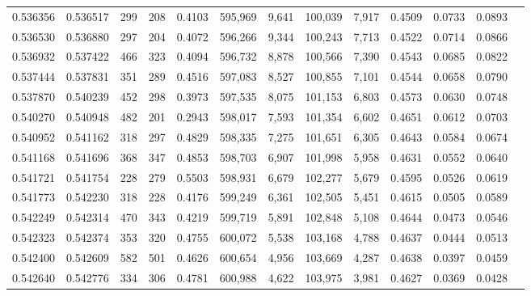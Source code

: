 \begin{tabular}{rrrrrrrrrrrrr}
0.536356 & 0.536517 &   299 &   208 &                                     0.4103 & 595,969 &   9,641 & 100,039 &   7,917 & 0.4509 & 0.0733 & 0.0893 \\
0.536530 & 0.536880 &   297 &   204 &                                     0.4072 & 596,266 &   9,344 & 100,243 &   7,713 & 0.4522 & 0.0714 & 0.0866 \\
0.536932 & 0.537422 &   466 &   323 &                                     0.4094 & 596,732 &   8,878 & 100,566 &   7,390 & 0.4543 & 0.0685 & 0.0822 \\
0.537444 & 0.537831 &   351 &   289 &                                     0.4516 & 597,083 &   8,527 & 100,855 &   7,101 & 0.4544 & 0.0658 & 0.0790 \\
0.537870 & 0.540239 &   452 &   298 &                                     0.3973 & 597,535 &   8,075 & 101,153 &   6,803 & 0.4573 & 0.0630 & 0.0748 \\
0.540270 & 0.540948 &   482 &   201 &                                     0.2943 & 598,017 &   7,593 & 101,354 &   6,602 & 0.4651 & 0.0612 & 0.0703 \\
0.540952 & 0.541162 &   318 &   297 &                                     0.4829 & 598,335 &   7,275 & 101,651 &   6,305 & 0.4643 & 0.0584 & 0.0674 \\
0.541168 & 0.541696 &   368 &   347 &                                     0.4853 & 598,703 &   6,907 & 101,998 &   5,958 & 0.4631 & 0.0552 & 0.0640 \\
0.541721 & 0.541754 &   228 &   279 &                                     0.5503 & 598,931 &   6,679 & 102,277 &   5,679 & 0.4595 & 0.0526 & 0.0619 \\
0.541773 & 0.542230 &   318 &   228 &                                     0.4176 & 599,249 &   6,361 & 102,505 &   5,451 & 0.4615 & 0.0505 & 0.0589 \\
0.542249 & 0.542314 &   470 &   343 &                                     0.4219 & 599,719 &   5,891 & 102,848 &   5,108 & 0.4644 & 0.0473 & 0.0546 \\
0.542323 & 0.542374 &   353 &   320 &                                     0.4755 & 600,072 &   5,538 & 103,168 &   4,788 & 0.4637 & 0.0444 & 0.0513 \\
0.542400 & 0.542609 &   582 &   501 &                                     0.4626 & 600,654 &   4,956 & 103,669 &   4,287 & 0.4638 & 0.0397 & 0.0459 \\
0.542640 & 0.542776 &   334 &   306 &                                     0.4781 & 600,988 &   4,622 & 103,975 &   3,981 & 0.4627 & 0.0369 & 0.0428 \\

\end{tabular}

